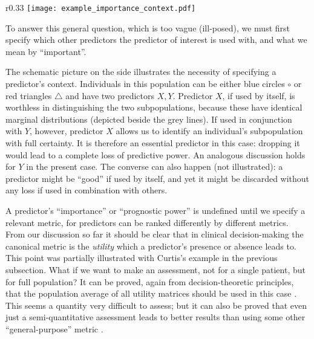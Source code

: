 \documentclass[utf8]{FrontiersinHarvard} %
\newcommand*{\sect}{\S}%
\newcommand*{\cf}{{cf.}}
\renewcommand*{\|}[1][]{\nonscript\:#1\vert\nonscript\:\mathopen{}}
\begin{document}
\setlength{\intextsep}{0ex}%
\setlength{\columnsep}{1ex}%
\begin{wrapfigure}{r}{0.33\linewidth}%
\vspace{-1ex}%
\texttt{[image: example\_importance\_context.pdf]}%
\end{wrapfigure}%
To answer this general question, which is too vague (ill-posed), we must first specify which other predictors the predictor of interest is used with, and what we mean by \enquote{important}.

The schematic picture on the side illustrates the necessity of specifying a predictor's context. Individuals in this population can be either \textcolor{bluepurple}{blue circles $\circ$} or \textcolor{redpurple}{red triangles $\triangle$} and have two predictors $X,Y$. Predictor $X$, if used by itself, is worthless in distinguishing the two subpopulations, because these have identical marginal distributions (depicted beside the grey lines). If used in conjunction with $Y$, however, predictor $X$ allows us to identify an individual's subpopulation with full certainty. It is therefore an essential predictor in this case: dropping it would lead to a complete loss of predictive power. An analogous discussion holds for $Y$ in the present case. The converse can also happen (not illustrated): a predictor might be \enquote{good} if used by itself, and yet it might be discarded without any loss if used in combination with others.

A predictor's \enquote{importance} or \enquote{prognostic power} is undefined until we specify a relevant metric, for predictors can be ranked differently by different metrics. From our discussion so far it should be clear that in clinical decision-making the canonical metric is the \emph{utility} which a predictor's presence or absence leads to. This point was partially illustrated with Curtis's example in the previous subsection. What if we want to make an assessment, not for a single patient, but for full population? It can be proved, again from decision-theoretic principles, that the population average of all utility matrices should be used in this case \citep[\cf][\sect~4.1]{dyrlandetal2022}. This seems a quantity very difficult to assess; but it can also be proved that even just a semi-quantitative assessment leads to better results than using some other \enquote{general-purpose} metric \citep[\sect~4.2]{dyrlandetal2022}.
\end{document}
